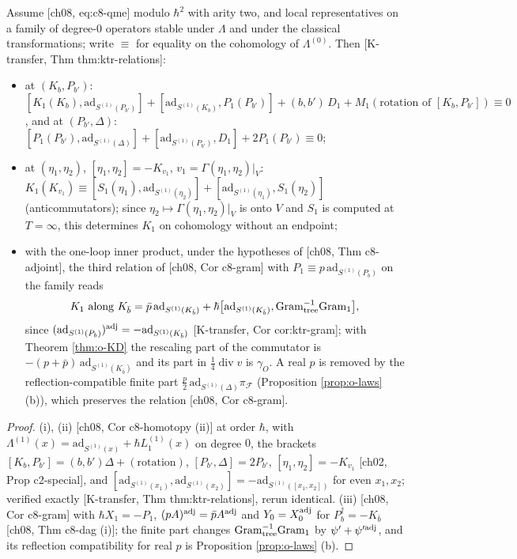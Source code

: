 \begin{proposition}
\label{prop:o-Kconsistent}
Assume [ch08, eq:c8-qme] modulo $\hbar^2$ with arity two, and local representatives on a family of degree-$0$ operators stable under $\Lambda$ and under the classical transformations; write $\equiv$ for equality on the cohomology of $\Lambda^{(0)}$. Then [K-transfer, Thm thm:ktr-relations]:
\begin{itemize}
\item[(i)] at $(K_b,P_{b'})$: $[K_1(K_b),\mathrm{ad}_{S^{(1)}(P_{b'})}]+[\mathrm{ad}_{S^{(1)}(K_b)},P_1(P_{b'})]+(b,b')\,D_1+M_1(\text{rotation of }[K_b,P_{b'}])\equiv0$, and at $(P_{b'},\Delta)$: $[P_1(P_{b'}),\mathrm{ad}_{S^{(1)}(\Delta)}]+[\mathrm{ad}_{S^{(1)}(P_{b'})},D_1]+2P_1(P_{b'})\equiv0$;
\item[(ii)] at $(\eta_1,\eta_2)$, $[\eta_1,\eta_2]=-K_{v_1}$, $v_1=\Gamma(\eta_1,\eta_2)|_V$: $K_1(K_{v_1})\equiv[S_1(\eta_1),\mathrm{ad}_{S^{(1)}(\eta_2)}]+[\mathrm{ad}_{S^{(1)}(\eta_1)},S_1(\eta_2)]$ (anticommutators); since $\eta_2\mapsto\Gamma(\eta_1,\eta_2)|_V$ is onto $V$ and $S_1$ is computed at $T=\infty$, this determines $K_1$ on cohomology without an endpoint;
\item[(iii)] with the one-loop inner product, under the hypotheses of [ch08, Thm c8-adjoint], the third relation of [ch08, Cor c8-gram] with $P_1\equiv p\,\mathrm{ad}_{S^{(1)}(P_b)}$ on the family reads
\[
K_1\text{ along }K_{\bar b}=\bar p\,\mathrm{ad}_{S^{(1)}(K_{\bar b})}+\hbar\big[\mathrm{ad}_{S^{(1)}(K_{\bar b})},\mathrm{Gram}_{\rm tree}^{-1}\mathrm{Gram}_1\big],
\]
since $(\mathrm{ad}_{S^{(1)}(P_b)})^{\rm adj}=-\mathrm{ad}_{S^{(1)}(K_{\bar b})}$ [K-transfer, Cor cor:ktr-gram]; with Theorem \ref{thm:o-KD} the rescaling part of the commutator is $-(p+\bar p)\,\mathrm{ad}_{S^{(1)}(K_{\bar b})}$ and its part in $\tfrac14\operatorname{div}v$ is $\gamma_O$. A real $p$ is removed by the reflection-compatible finite part $\tfrac p2\,\mathrm{ad}_{S^{(1)}(\Delta)}\pi_{\mathcal F}$ (Proposition \ref{prop:o-laws} (b)), which preserves the relation [ch08, Cor c8-gram].
\end{itemize}
\end{proposition}

\begin{proof}
(i), (ii) [ch08, Cor c8-homotopy (ii)] at order $\hbar$, with $\Lambda^{(1)}(x)=\mathrm{ad}_{S^{(1)}(x)}+\hbar L_1^{(1)}(x)$ on degree $0$, the brackets $[K_b,P_{b'}]=(b,b')\Delta+(\text{rotation})$, $[P_{b'},\Delta]=2P_{b'}$, $[\eta_1,\eta_2]=-K_{v_1}$ [ch02, Prop c2-special], and $[\mathrm{ad}_{S^{(1)}(x_1)},\mathrm{ad}_{S^{(1)}(x_2)}]=-\mathrm{ad}_{S^{(1)}([x_1,x_2])}$ for even $x_1,x_2$; verified exactly [K-transfer, Thm thm:ktr-relations], rerun identical. (iii) [ch08, Cor c8-gram] with $\hbar X_1=-P_1$, $(pA)^{\rm adj}=\bar pA^{\rm adj}$ and $Y_0=X_0^{\rm adj}$ for $P_b^\dagger=-K_{\bar b}$ [ch08, Thm c8-dag (i)]; the finite part changes $\mathrm{Gram}_{\rm tree}^{-1}\mathrm{Gram}_1$ by $\psi'+\psi'^{\rm adj}$, and its reflection compatibility for real $p$ is Proposition \ref{prop:o-laws} (b).
\end{proof}

